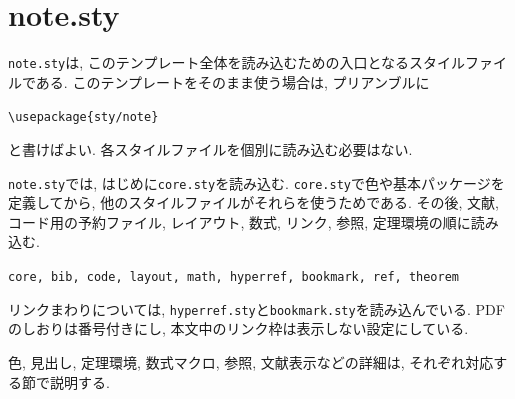 \documentclass[../main.tex]{subfiles}
\begin{document}
\section{note.sty}

\texttt{note.sty}は, このテンプレート全体を読み込むための入口となるスタイルファイルである. 
このテンプレートをそのまま使う場合は, プリアンブルに
\begin{center}
	\verb|\usepackage{sty/note}|
\end{center}
と書けばよい. 各スタイルファイルを個別に読み込む必要はない. 

\texttt{note.sty}では, はじめに\texttt{core.sty}を読み込む. 
\texttt{core.sty}で色や基本パッケージを定義してから, 他のスタイルファイルがそれらを使うためである. 
その後, 文献, コード用の予約ファイル, レイアウト, 数式, リンク, 参照, 定理環境の順に読み込む. 
\begin{center}
	\texttt{core, bib, code, layout, math, hyperref, bookmark, ref, theorem}
\end{center}

リンクまわりについては, \texttt{hyperref.sty}と\texttt{bookmark.sty}を読み込んでいる. 
PDFのしおりは番号付きにし, 本文中のリンク枠は表示しない設定にしている. 

色, 見出し, 定理環境, 数式マクロ, 参照, 文献表示などの詳細は, それぞれ対応する節で説明する. 
\end{document}
